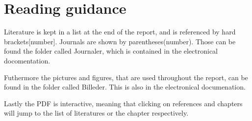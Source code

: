 \documentclass[../../main]{subfiles}
\begin{document}
\section{Reading guidance}

Literature is kept in a list at the end of the report, and is referenced by hard brackets[number].
Journals are shown by parentheses(number).
Those can be found the folder called Journaler, which is contained in the electronical docomentation.

Futhermore the pictures and figures, that are used throughout the report, can be found in the folder called Billeder. This is also in the electronical documenation.

Lastly the PDF is interactive, meaning that clicking on references and chapters will jump to the list of literatures or the chapter respectively.
\end{document}
